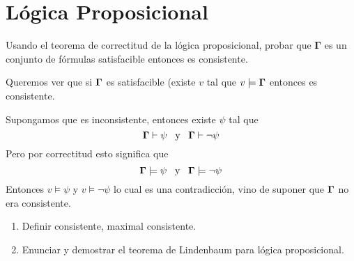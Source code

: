 \documentclass[leqno, 12pt, twoside,letterpaper]{book}
\begin{document}
\section*{Lógica Proposicional}

\begin{ej}{5}
    Usando el teorema de correctitud de la lógica proposicional, probar que
    $\bm{\Gamma}$ es un conjunto de fórmulas satisfacible entonces es
    consistente.
\end{ej}

\begin{solucion}
Queremos ver que si $\bm{\Gamma}$ es satisfacible (existe $v$ tal que $v \models \bm{\Gamma}$ entonces es consistente.
\begin{dem}
Supongamos que es inconsistente, entonces existe $\psi$ tal que
\[ \bm{\Gamma} \vdash \psi  \mbox { \, y \, } \bm{\Gamma} \vdash \lnot\psi \]
Pero por correctitud esto significa que
\[ \bm{\Gamma} \models \psi \mbox { \, y \, } \bm{\Gamma} \models \lnot\psi \]
Entonces $v \models \psi$ y $v \models \lnot\psi$ lo cual es una contradicción, vino de suponer que $\bm{\Gamma}$ no era consistente.
\end{dem}
\end{solucion}

\begin{ej}{4}
    \begin{enumerate}
    \item Definir consistente, maximal consistente.
    \item Enunciar y demostrar el teorema de Lindenbaum para lógica proposicional.
    \end{enumerate}
\end{ej}
\end{document}
